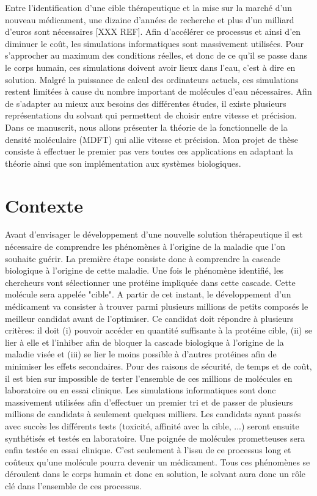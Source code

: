 Entre l'identification d'une cible thérapeutique et la mise sur la marché d'un nouveau médicament, une dizaine d'années de recherche et plus d'un milliard d’euros sont nécessaires [XXX REF]. Afin d'accélérer ce processus et ainsi d'en diminuer le coût, les simulations informatiques sont massivement utilisées. Pour s'approcher au maximum des conditions réelles, et donc de ce qu'il se passe dans le corps humain, ces simulations doivent avoir lieux dans l'eau, c'est à dire en solution. Malgré la puissance de calcul des ordinateurs actuels, ces simulations restent limitées à cause du nombre important de molécules d'eau nécessaires. Afin de s'adapter au mieux aux besoins des différentes études, il existe plusieurs représentations du solvant qui permettent de choisir entre vitesse et précision. Dans ce manuscrit, nous allons présenter la théorie de la fonctionnelle de la densité moléculaire (MDFT) qui allie vitesse et précision. Mon projet de thèse consiste à effectuer le premier pas vers toutes ces applications en adaptant la théorie ainsi que son implémentation aux systèmes biologiques.



\section{Contexte}
Avant d'envisager le développement d'une nouvelle solution thérapeutique il est nécessaire de comprendre les phénomènes à l'origine de la maladie que l'on souhaite guérir. La première étape consiste donc à comprendre la cascade biologique à l'origine de cette maladie. Une fois le phénomène identifié, les chercheurs vont sélectionner une protéine impliquée dans cette cascade. Cette molécule sera appelée "cible". A partir de cet instant, le développement d'un médicament va consister à trouver  parmi plusieurs millions de petits composés le meilleur candidat avant de l'optimiser. Ce candidat doit répondre à plusieurs critères: il doit (i) pouvoir accéder en quantité suffisante à la protéine cible, (ii) se lier à elle et l'inhiber afin de bloquer la cascade biologique à l'origine de la maladie visée et (iii) se lier le moins possible à d'autres protéines afin de minimiser les effets secondaires. Pour des raisons de sécurité, de temps et de coût, il est bien sur impossible de tester l'ensemble de ces millions de molécules en laboratoire ou en essai clinique. Les simulations informatiques sont donc massivement utilisées afin d'effectuer un premier tri et de passer de plusieurs millions de candidats à seulement quelques milliers. Les candidats ayant passés avec succès les différents tests (toxicité, affinité avec la cible, ...) seront ensuite synthétisés et testés en laboratoire. Une poignée de molécules prometteuses sera enfin testée en essai clinique. C'est seulement à l'issu de ce processus long et coûteux qu'une molécule pourra devenir un médicament. Tous ces phénomènes se déroulent dans le corps humain et donc en solution, le solvant aura donc un rôle clé dans l'ensemble de ces processus.



